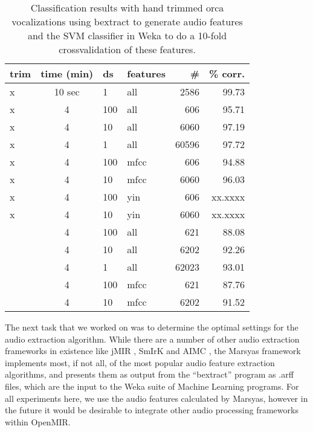 \begin{table}
\begin{tabular}{|l|c|l|l|r|r|}
\hline
 trim & time (min)  & ds & features & \# & \% corr.  \\
\hline
 x & 10 sec  &  1   & all   &    2586  &    99.73  \\
\hline
 x & 4       & 100  & all   &     606  &    95.71  \\
 x & 4       & 10   & all   &    6060  &    97.19  \\ 
 x & 4       & 1    & all   &   60596  &    97.72  \\
 x & 4       & 100  & mfcc  &     606  &    94.88  \\
 x & 4       & 10   & mfcc  &    6060  &    96.03  \\
 x & 4       & 100  & yin   &     606  &    xx.xxxx  \\
 x & 4       & 10   & yin   &    6060  &    xx.xxxx  \\
\hline
   & 4       & 100  & all   &     621  &    88.08  \\
   & 4       & 10   & all   &    6202  &    92.26  \\
   & 4       & 1    & all   &   62023  &    93.01  \\
   & 4       & 100  & mfcc  &     621  &    87.76  \\
   & 4       & 10   & mfcc  &    6202  &    91.52  \\
\hline
\end{tabular}
\caption{Classification results with hand trimmed orca vocalizations
  using bextract to generate audio features and the SVM classifier in
  Weka to do a 10-fold crossvalidation of these features.}
\label{table:handTrimmed}
\end{table}

The next task that we worked on was to determine the optimal settings
for the audio extraction algorithm.  While there are a number of other
audio extraction frameworks in existence like jMIR \cite{mckayphd},
SmIrK \cite{wang07} and AIMC \cite{waltersphd}, the Marsyas framework
implements most, if not all, of the most popular audio feature
extraction algorithms, and presents them as output from the
``bextract'' program as .arff files, which are the input to the Weka
suite of Machine Learning programs.  For all experiments here, we use
the audio features calculated by Marsyas, however in the future it
would be desirable to integrate other audio processing frameworks
within OpenMIR.

